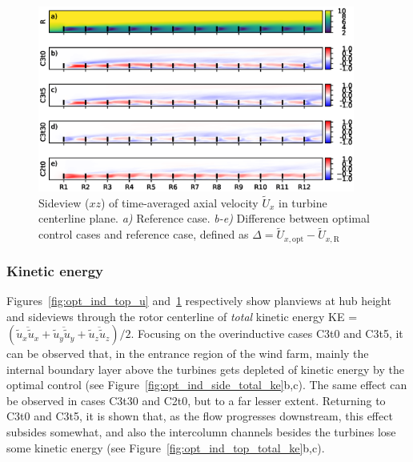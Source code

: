 	\begin{figure}[hbt]
		\centering
		\includegraphics[width=0.93\textwidth]{chapters/optimal_induction_control/sideview_u.eps}
		\caption[Sideview ($xz$) of time-averaged axial velocity $\widetilde{U}_x$ in turbine centerline plane.]{Sideview ($xz$) of time-averaged axial velocity $\widetilde{U}_x$ in turbine centerline plane. \emph{a) } Reference case. \emph{b-e)} Difference between optimal control cases and reference case, defined as $\Delta = \widetilde{U}_{x,\text{opt}} - \widetilde{U}_{x,\text{R}}$  \label{fig:opt_ind_side_u}}
	\end{figure}	
	
	
	\subsubsection{Kinetic energy}

	Figures~\ref{fig:opt_ind_top_u} and~\ref{fig:opt_ind_side_u} respectively show planviews at hub height and sideviews through the rotor
	centerline of \emph{total} kinetic energy KE = $(\overline{\widetilde{u}_x \widetilde{u}_x} + \overline{\widetilde{u}_y \widetilde{u}_y} + \overline{\widetilde{u}_z \widetilde{u}_z})/2$. Focusing on the overinductive cases C3t0 and C3t5, it can be observed that, in the entrance region of the wind farm, mainly the internal boundary layer above the turbines gets depleted of kinetic energy by the optimal control (see Figure~\ref{fig:opt_ind_side_total_ke}b,c). The same effect can be observed in cases C3t30 and C2t0, but to a far lesser extent. Returning to C3t0 and C3t5, it is shown that, as the flow progresses downstream, this effect subsides somewhat, and also the intercolumn channels besides the turbines lose some kinetic energy (see Figure~\ref{fig:opt_ind_top_total_ke}b,c). 

